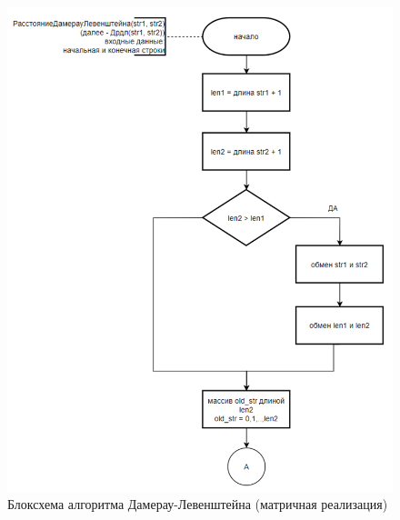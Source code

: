 \begin{figure}[H]
    \centering
    \includegraphics[width=1.05\textwidth]{img/block_2_1_1.png}
    \caption{Блоксхема алгоритма Дамерау-Левенштейна (матричная реализация)}
\end{figure}


